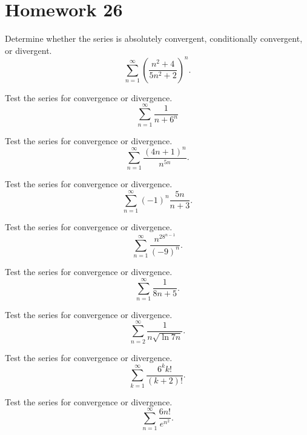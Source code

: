 \section*{Homework 26}
\begin{problem}[WebAssign HW 26, \# 1]
Determine whether the series is absolutely convergent, conditionally
convergent, or divergent.
\[
\sum_{n=1}^\infty\left(\frac{n^2+4}{5n^2+2}\right)^n.
\]
\end{problem}
\begin{problem}[WebAssign HW 26, \# 2]
Test the series for convergence or divergence.
\[
\sum_{n=1}^\infty\frac{1}{n+6^n}
\]
\end{problem}
\begin{problem}[WebAssign HW 26, \# 3]
Test the series for convergence or divergence.
\[
\sum_{n=1}^\infty\frac{(4n+1)^n}{n^{5n}}.
\]
\end{problem}
\begin{problem}[WebAssign HW 26, \# 4]
Test the series for convergence or divergence.
\[
\sum_{n=1}^\infty (-1)^n\frac{5n}{n+3}.
\]
\end{problem}
\begin{problem}[WebAssign HW 26, \# 5]
Test the series for convergence or divergence.
\[
\sum_{n=1}^\infty\frac{n^28^{n-1}}{(-9)^n}.
\]
\end{problem}
\begin{problem}[WebAssign HW 26, \# 6]
Test the series for convergence or divergence.
\[
\sum_{n=1}^\infty \frac{1}{8n+5}.
\]
\end{problem}
\begin{problem}[WebAssign HW 26, \# 7]
Test the series for convergence or divergence.
\[
\sum_{n=2}^\infty\frac{1}{n\sqrt{\ln 7n}}.
\]
\end{problem}
\begin{problem}[WebAssign HW 26, \# 8]
Test the series for convergence or divergence.
\[
\sum_{k=1}^\infty\frac{6^kk!}{(k+2)!}.
\]
\end{problem}
\begin{problem}[WebAssign HW 26, \# 9]
Test the series for convergence or divergence.
\[
\sum_{n=1}^\infty\frac{6n!}{e^{n^2}}.
\]
\end{problem}
